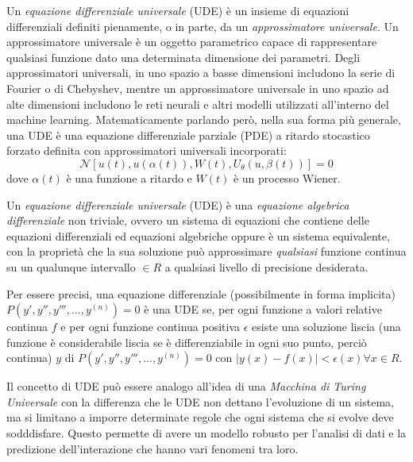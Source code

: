 Un \emph{equazione differenziale universale} (UDE) è un insieme di equazioni differenziali definiti pienamente,
o in parte, da un \emph{approssimatore universale}. Un approssimatore universale è un oggetto parametrico 
capace di rappresentare qualsiasi funzione dato una determinata dimensione dei parametri. Degli approssimatori 
universali, in uno spazio a basse dimensioni includono la serie di Fourier o di Chebyshev, mentre un 
approssimatore universale in uno spazio ad alte dimensioni includono le reti neurali e altri modelli utilizzati 
all'interno del machine learning. Matematicamente parlando però, nella sua forma più generale, una UDE è 
una equazione differenziale parziale (PDE) a ritardo stocastico forzato definita con approssimatori universali incorporati:
$$\mathcal{N}[u(t), u(\alpha(t)), W(t), U_\theta(u, \beta(t))] = 0$$
dove $\alpha(t)$ è una funzione a ritardo e $W(t)$ è un processo Wiener.

Un \emph{equazione differenziale universale} (UDE) è una \emph{equazione algebrica
differenziale} 
non triviale, ovvero un sistema di equazioni che contiene delle equazioni differenziali
ed equazioni algebriche oppure è un sistema equivalente,
con la proprietà che la sua soluzione può approssimare
\emph{qualsiasi} funzione continua su un qualunque intervallo $\in R$ a 
qualsiasi livello di precisione desiderata. 

Per essere precisi, una equazione differenziale (possibilmente in forma implicita)
$P( y', y'', y''', ..., y^{(n)})=0$ è una UDE se, per ogni funzione a valori relative
continua $f$ e per ogni funzione continua positiva $\epsilon$ esiste una 
soluzione liscia (una funzione è considerabile liscia se è 
differenziabile in ogni suo punto, perciò continua) $y$ di $P( y', y'', y''', ..., y^{(n)})=0$
con $|y(x) - f(x)| < \epsilon(x) \forall x \in R$.

Il concetto di UDE può essere analogo all'idea di una \emph{Macchina di Turing Universale}
con la differenza che le UDE non dettano 
l'evoluzione di un sistema, ma si limitano a imporre determinate regole che 
ogni sistema che si evolve deve sodddisfare. Questo permette di avere un modello robusto 
per l'analisi di dati e la predizione dell'interazione che hanno vari fenomeni tra loro.

